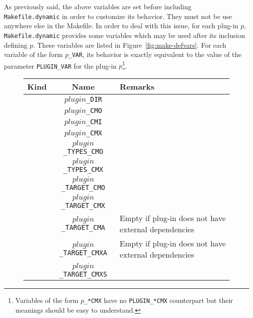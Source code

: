 As previously said, the above variables are set before including
\texttt{Makefile.dynamic} in order to customize its behavior. They
must not be use anywhere else in the Makefile. In order to deal with this
issue, for each plug-in $p$, \texttt{Makefile.dynamic} provides some variables
which may be used after its inclusion defining $p$. These variables are listed
in Figure~\ref{fig:make-defvars}. For each variable of the form
\texttt{$p$\_VAR}, its behavior is exactly equivalent to the value of the
parameter \texttt{PLUGIN\_VAR} for the plug-in $p$\footnote{Variables of the
  form \texttt{$p$\_*CMX} have no \texttt{PLUGIN\_*CMX} counterpart but their
  meanings should be easy to understand.}.
\begin{figure}[htbp]
\begin{center}
\begin{tabularx}{\textwidth}{|c|c|X|}
\hline
\textbf{Kind} & \textbf{Name}\footnotemark & \textbf{Remarks}\\
\hline
\hline \multirow{1}{35mm}{\centering{Usual information}}
& \texttt{$plugin$\_DIR}\index{plugin\_DIR@\texttt{$plugin$\_DIR}|bfit} & \\
\hline \multirow{5}{35mm}{\centering{Source files}}
& \texttt{$plugin$\_CMO}\index{plugin\_CMO@\texttt{$plugin$\_CMO}|bfit} & \\
& \texttt{$plugin$\_CMI}\index{plugin\_CMI@\texttt{$plugin$\_CMI}|bfit} & \\
& \texttt{$plugin$\_CMX}\index{plugin\_CMI@\texttt{$plugin$\_CMI}|bfit} & \\
& \texttt{$plugin$\_TYPES\_CMO}%
\index{plugin\_TYPES\_CMO@\texttt{$plugin$\_TYPES\_CMO}|bfit} & \\
& \texttt{$plugin$\_TYPES\_CMX}%
\index{plugin\_TYPES\_CMX@\texttt{$plugin$\_TYPES\_CMX}|bfit} & \\
\hline \multirow{10}{35mm}{\centering{Targets}}
& \texttt{$plugin$\_TARGET\_CMO}%
\index{plugin\_TARGET_CMO@\texttt{$plugin$\_TARGET\_CMO}|bfit} & \\
& \texttt{$plugin$\_TARGET\_CMX}%
\index{plugin\_TARGET\_CMX@\texttt{$plugin$\_TARGET\_CMX}|bfit} & \\
& \texttt{$plugin$\_TARGET\_CMA}%
\index{plugin\_TARGET\_CMA@\texttt{$plugin$\_TARGET\_CMA}|bfit} 
& Empty if plug-in does not have external dependencies
\\
& \texttt{$plugin$\_TARGET\_CMXA}%
\index{plugin\_TARGET\_CMXA@\texttt{$plugin$\_TARGET\_CMXA}|bfit} 
& Empty if plug-in does not have external dependencies
\\
& \texttt{$plugin$\_TARGET\_CMXS}%

\end{tabularx}
\end{center}
\end{figure}
